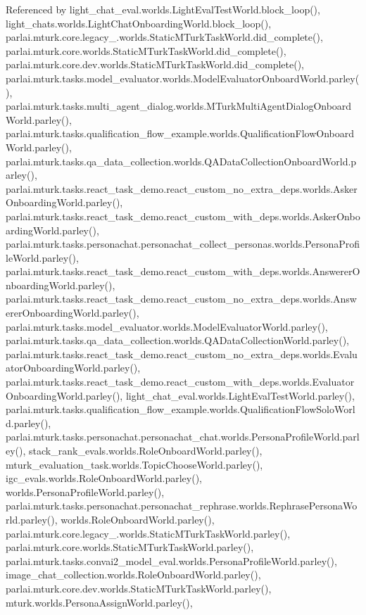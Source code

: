 Referenced by light\+\_\+chat\+\_\+eval.\+worlds.\+Light\+Eval\+Test\+World.\+block\+\_\+loop(), light\+\_\+chats.\+worlds.\+Light\+Chat\+Onboarding\+World.\+block\+\_\+loop(), parlai.\+mturk.\+core.\+legacy\+\_.\+worlds.\+Static\+M\+Turk\+Task\+World.\+did\+\_\+complete(), parlai.\+mturk.\+core.\+worlds.\+Static\+M\+Turk\+Task\+World.\+did\+\_\+complete(), parlai.\+mturk.\+core.\+dev.\+worlds.\+Static\+M\+Turk\+Task\+World.\+did\+\_\+complete(), parlai.\+mturk.\+tasks.\+model\+\_\+evaluator.\+worlds.\+Model\+Evaluator\+Onboard\+World.\+parley(), parlai.\+mturk.\+tasks.\+multi\+\_\+agent\+\_\+dialog.\+worlds.\+M\+Turk\+Multi\+Agent\+Dialog\+Onboard\+World.\+parley(), parlai.\+mturk.\+tasks.\+qualification\+\_\+flow\+\_\+example.\+worlds.\+Qualification\+Flow\+Onboard\+World.\+parley(), parlai.\+mturk.\+tasks.\+qa\+\_\+data\+\_\+collection.\+worlds.\+Q\+A\+Data\+Collection\+Onboard\+World.\+parley(), parlai.\+mturk.\+tasks.\+react\+\_\+task\+\_\+demo.\+react\+\_\+custom\+\_\+no\+\_\+extra\+\_\+deps.\+worlds.\+Asker\+Onboarding\+World.\+parley(), parlai.\+mturk.\+tasks.\+react\+\_\+task\+\_\+demo.\+react\+\_\+custom\+\_\+with\+\_\+deps.\+worlds.\+Asker\+Onboarding\+World.\+parley(), parlai.\+mturk.\+tasks.\+personachat.\+personachat\+\_\+collect\+\_\+personas.\+worlds.\+Persona\+Profile\+World.\+parley(), parlai.\+mturk.\+tasks.\+react\+\_\+task\+\_\+demo.\+react\+\_\+custom\+\_\+with\+\_\+deps.\+worlds.\+Answerer\+Onboarding\+World.\+parley(), parlai.\+mturk.\+tasks.\+react\+\_\+task\+\_\+demo.\+react\+\_\+custom\+\_\+no\+\_\+extra\+\_\+deps.\+worlds.\+Answerer\+Onboarding\+World.\+parley(), parlai.\+mturk.\+tasks.\+model\+\_\+evaluator.\+worlds.\+Model\+Evaluator\+World.\+parley(), parlai.\+mturk.\+tasks.\+qa\+\_\+data\+\_\+collection.\+worlds.\+Q\+A\+Data\+Collection\+World.\+parley(), parlai.\+mturk.\+tasks.\+react\+\_\+task\+\_\+demo.\+react\+\_\+custom\+\_\+no\+\_\+extra\+\_\+deps.\+worlds.\+Evaluator\+Onboarding\+World.\+parley(), parlai.\+mturk.\+tasks.\+react\+\_\+task\+\_\+demo.\+react\+\_\+custom\+\_\+with\+\_\+deps.\+worlds.\+Evaluator\+Onboarding\+World.\+parley(), light\+\_\+chat\+\_\+eval.\+worlds.\+Light\+Eval\+Test\+World.\+parley(), parlai.\+mturk.\+tasks.\+qualification\+\_\+flow\+\_\+example.\+worlds.\+Qualification\+Flow\+Solo\+World.\+parley(), parlai.\+mturk.\+tasks.\+personachat.\+personachat\+\_\+chat.\+worlds.\+Persona\+Profile\+World.\+parley(), stack\+\_\+rank\+\_\+evals.\+worlds.\+Role\+Onboard\+World.\+parley(), mturk\+\_\+evaluation\+\_\+task.\+worlds.\+Topic\+Choose\+World.\+parley(), igc\+\_\+evals.\+worlds.\+Role\+Onboard\+World.\+parley(), worlds.\+Persona\+Profile\+World.\+parley(), parlai.\+mturk.\+tasks.\+personachat.\+personachat\+\_\+rephrase.\+worlds.\+Rephrase\+Persona\+World.\+parley(), worlds.\+Role\+Onboard\+World.\+parley(), parlai.\+mturk.\+core.\+legacy\+\_.\+worlds.\+Static\+M\+Turk\+Task\+World.\+parley(), parlai.\+mturk.\+core.\+worlds.\+Static\+M\+Turk\+Task\+World.\+parley(), parlai.\+mturk.\+tasks.\+convai2\+\_\+model\+\_\+eval.\+worlds.\+Persona\+Profile\+World.\+parley(), image\+\_\+chat\+\_\+collection.\+worlds.\+Role\+Onboard\+World.\+parley(), parlai.\+mturk.\+core.\+dev.\+worlds.\+Static\+M\+Turk\+Task\+World.\+parley(), mturk.\+worlds.\+Persona\+Assign\+World.\+parley(), 